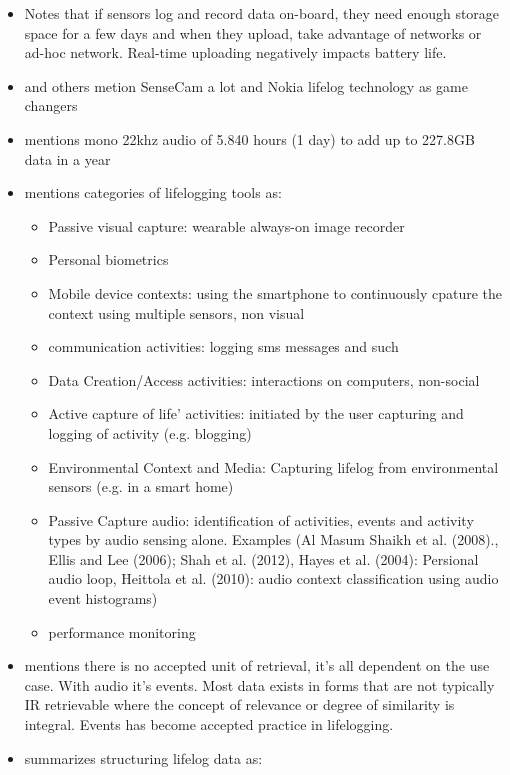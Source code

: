 \begin{itemize}
\begin{itemize}
	\end{itemize}
	\item \cite{gurrin2014lifelogging} Notes that if sensors log and record data on-board, they need enough storage space for a few days and when they upload, take advantage of networks or ad-hoc network. Real-time uploading negatively impacts battery life.
	\item \cite{gurrin2014lifelogging} and others metion SenseCam a lot and Nokia lifelog technology as game changers
	\item \cite{gurrin2014lifelogging} mentions mono 22khz audio of 5.840 hours (1 day) to add up to 227.8GB data in a year
	\item \cite{gurrin2014lifelogging} mentions categories of lifelogging tools as:
	\begin{itemize}
		\item Passive visual capture: wearable always-on image recorder
		\item Personal biometrics
		\item Mobile device contexts: using the smartphone to continuously cpature the context using multiple sensors, non visual
		\item communication activities: logging sms messages and such
		\item Data Creation/Access activities: interactions on computers, non-social
		\item Active capture of life' activities: initiated by the user capturing and logging of activity (e.g. blogging)
		\item Environmental Context and Media: Capturing lifelog from environmental sensors (e.g. in a smart home)
		\item Passive Capture audio: identification of activities, events and activity types by audio sensing alone. Examples (Al Masum Shaikh et al. (2008)., Ellis and Lee (2006); Shah et al.
		(2012), Hayes et al. (2004): Persional audio loop, Heittola et al. (2010): audio context classification using audio event histograms)
		\item performance monitoring
	\end{itemize}
	\item \cite{gurrin2014lifelogging} mentions there is no accepted unit of retrieval, it's all dependent on the use case. With audio it's events. Most data exists in forms that are not typically IR retrievable where the concept of relevance or degree of similarity is integral. Events has become accepted practice in lifelogging.
	\item \cite{gurrin2014lifelogging} summarizes structuring lifelog data as:

\end{itemize}

